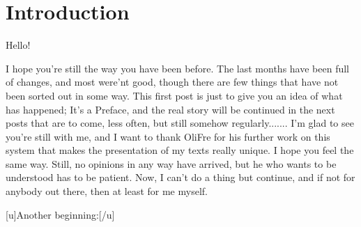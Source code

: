\chapter{Introduction}
\label{cha:introduction}
Hello!

I hope you're still the way you have been before. The last months have been full of changes, and most were'nt good, though there are few things that have not been sorted out in some way. This first post is just to give you an idea of what has happened; It's a Preface, and the real story will be continued in the next posts that are to come, less often, but still somehow regularly.......
I'm glad to see you're still with me, and I want to thank OliFre for his further work on this system that makes the presentation of my texts really unique. I hope you feel the same way. 
Still, no opinions in any way have arrived, but he who wants to be understood has to be patient. Now, I can't do a thing but continue, and if not for anybody out there, then at least for me myself. 


[u]Another beginning:[/u]

